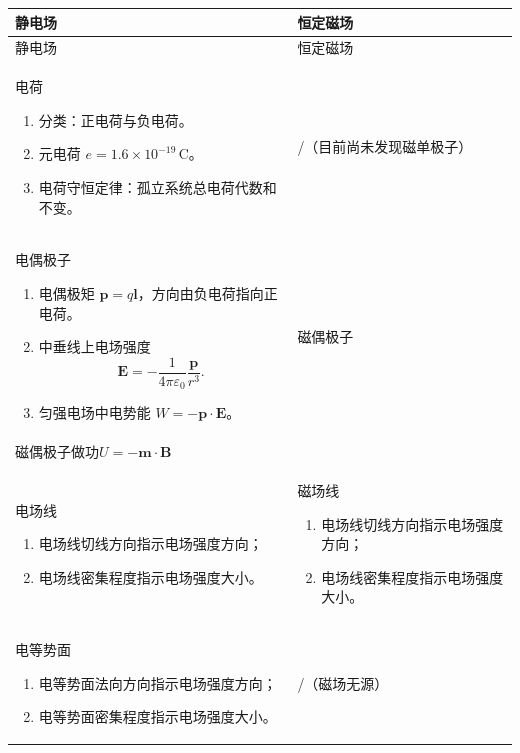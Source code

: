 \documentclass[UTF8,fontset=fandol,zihao=5]{ctexart}
\newcommand{\vect}[1]{\bm{#1}}
\begin{document}
\begingroup
\small
\renewcommand{\arraystretch}{1.15}
\setlength{\tabcolsep}{6pt}
\begin{longtable}{|>{\raggedright\arraybackslash}p{}|>{\raggedright\arraybackslash}p{}|}
\hline
\centering 静电场 & \centering\arraybackslash 恒定磁场\\ \hline
\endfirsthead
\hline
\centering 静电场 & \centering\arraybackslash 恒定磁场\\ \hline
\endhead

\centering 电荷
\begin{enumerate}
  \item 分类：正电荷与负电荷。
  \item 元电荷 \(e=1.6\times10^{-19}\,\mathrm C\)。
  \item 电荷守恒定律：孤立系统总电荷代数和不变。
\end{enumerate}
& \centering\arraybackslash /（目前尚未发现磁单极子）\\ \hline

\centering 电偶极子
\begin{enumerate}
  \item 电偶极矩 \(\vect p=q\vect l\)，方向由负电荷指向正电荷。
  \item 中垂线上电场强度
  \[
    \vect E=-\frac{1}{4\pi\varepsilon_0}\frac{\vect p}{r^3}.
  \]
  \item 匀强电场中电势能 \(W=-\vect p\cdot\vect E\)。
\end{enumerate}
& \centering\arraybackslash 磁偶极子 \\
磁偶极子做功$U=- \vect m \cdot \vect B$ \\
\hline

\centering 电场线
\begin{enumerate}
  \item 电场线切线方向指示电场强度方向；
  \item 电场线密集程度指示电场强度大小。
\end{enumerate}
& \centering\arraybackslash 磁场线
\begin{enumerate}
  \item 电场线切线方向指示电场强度方向；
  \item 电场线密集程度指示电场强度大小。
\end{enumerate}
\\ \hline

\centering 电等势面
\begin{enumerate}
  \item 电等势面法向方向指示电场强度方向；
  \item 电等势面密集程度指示电场强度大小。
\end{enumerate}
& \centering\arraybackslash /（磁场无源）\\ \hline


\end{longtable}
\end{document}
